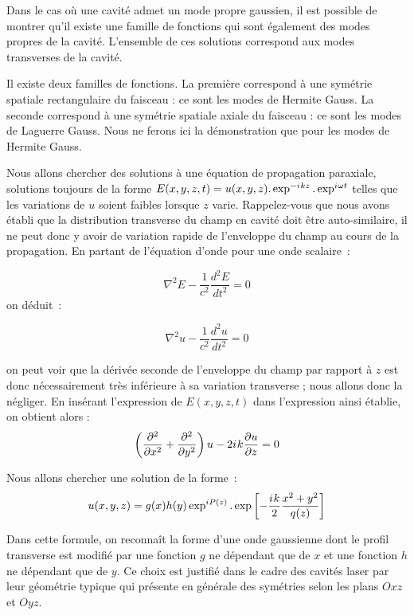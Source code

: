\documentclass[a4paper]{book}
\newcommand{\iu}{{i\mkern1mu}}
\begin{document}
Dans le cas où une cavité admet un mode propre gaussien, il est possible de montrer qu'il existe une famille de fonctions qui sont également des modes propres de la cavité. L'ensemble de ces solutions correspond aux modes transverses de la cavité.

Il existe deux familles de fonctions. La première correspond à une symétrie spatiale rectangulaire du faisceau : ce sont les
modes de Hermite Gauss. La seconde correspond à une symétrie spatiale axiale du faisceau : ce sont les modes de Laguerre Gauss.
Nous ne ferons ici la démonstration que pour les modes de Hermite Gauss.

Nous allons chercher des solutions à une équation de propagation paraxiale, solutions toujours de la forme $E(x,y,z,t)=u(x,y,z).\exp^{-\iu kz}.\exp^{\iu \omega t}$ telles que les variations de $u$ soient faibles lorsque $z$ varie. Rappelez-vous que nous avons établi que la distribution transverse du champ en cavité doit être auto-similaire, il ne peut donc y avoir de variation rapide de l'enveloppe du champ au cours de la propagation. En partant de l'équation d'onde pour une onde scalaire~:

\begin{equation}
    \nabla^2E -\frac{1}{c^2}\frac{d^2E}{dt^2}=0
\end{equation}
on déduit~: 

\begin{equation}
    \nabla^2u -\frac{1}{c^2}\frac{d^2u}{dt^2}=0
\end{equation}

on peut voir que la dérivée seconde de l'enveloppe du champ par rapport à $z$ est donc nécessairement très inférieure à sa variation transverse ; nous allons donc la négliger. En insérant l'expression de $E(x,y,z,t)$ dans l'expression ainsi établie, on obtient alors : 
\begin{equation}
    \left(\frac{\partial^2}{\partial x^2}+\frac{\partial^2 }{\partial y^2}\right)u-2\iu k \frac{\partial u}{\partial z}=0
\end{equation}

Nous allons chercher une solution de la forme~:
\begin{equation}
    u(x,y,z)=g(x)h(y)\exp^{iP(z)}.\exp\left[-\frac{\iu k }{2}\frac{x^2+y^2}{q(z)}\right]
\end{equation}

Dans cette formule, on reconnaît la forme d'une onde gaussienne dont le profil transverse est modifié par une fonction $g$ ne dépendant que de $x$ et une fonction $h$ ne dépendant que de $y$. Ce choix est justifié dans le cadre des cavités laser par leur géométrie typique qui présente en générale des symétries selon les plans $Oxz$ et $Oyz$.
\end{document}
